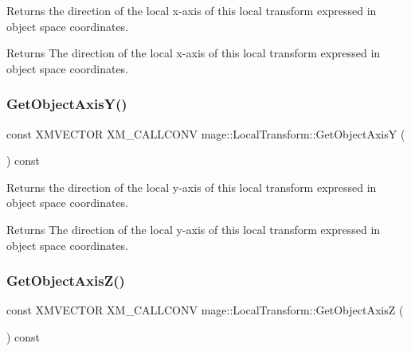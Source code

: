 Returns the direction of the local x-\/axis of this local transform expressed in object space coordinates.

\begin{DoxyReturn}{Returns}
The direction of the local x-\/axis of this local transform expressed in object space coordinates. 
\end{DoxyReturn}
\hypertarget{classmage_1_1_local_transform_accd789cb8a8f3cec2c048cfb05ef8eb3}{}\label{classmage_1_1_local_transform_accd789cb8a8f3cec2c048cfb05ef8eb3} 
\subsubsection{\texorpdfstring{Get\+Object\+Axis\+Y()}{GetObjectAxisY()}}
{\footnotesize\ttfamily const X\+M\+V\+E\+C\+T\+OR X\+M\+\_\+\+C\+A\+L\+L\+C\+O\+NV mage\+::\+Local\+Transform\+::\+Get\+Object\+AxisY (\begin{DoxyParamCaption}{ }\end{DoxyParamCaption}) const\hspace{0.3cm}{\ttfamily [noexcept]}}

Returns the direction of the local y-\/axis of this local transform expressed in object space coordinates.

\begin{DoxyReturn}{Returns}
The direction of the local y-\/axis of this local transform expressed in object space coordinates. 
\end{DoxyReturn}
\hypertarget{classmage_1_1_local_transform_a4a7a5e9b38ad3016a9f4db5c46cca782}{}\label{classmage_1_1_local_transform_a4a7a5e9b38ad3016a9f4db5c46cca782} 
\subsubsection{\texorpdfstring{Get\+Object\+Axis\+Z()}{GetObjectAxisZ()}}
{\footnotesize\ttfamily const X\+M\+V\+E\+C\+T\+OR X\+M\+\_\+\+C\+A\+L\+L\+C\+O\+NV mage\+::\+Local\+Transform\+::\+Get\+Object\+AxisZ (\begin{DoxyParamCaption}{ }\end{DoxyParamCaption}) const\hspace{0.3cm}{\ttfamily [noexcept]}}

